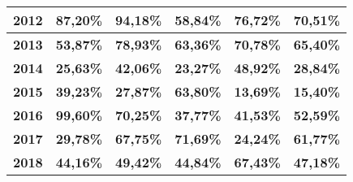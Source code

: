 \documentclass[
	12pt,		%
	a4paper,	%
	english,	%
	brazil,		%
	openright,	%
	oneside		%
	]{abntex2}
\begin{document}
\begin{table}[h]
\begin{tabular}{|c|c|c|c|c|c|}
\rowcolor[HTML]{80C397} 
\textbf{2012}                         & \textbf{87,20\%}                                              & \textbf{94,18\%}                                                & \textbf{58,84\%}                                                  & \textbf{76,72\%}                                                     & \textbf{70,51\%}                                                             \\ \hline
\textbf{2013}                         & \textbf{53,87\%}                                              & \textbf{78,93\%}                                                & \textbf{63,36\%}                                                  & \textbf{70,78\%}                                                     & \textbf{65,40\%}                                                             \\ \hline
\rowcolor[HTML]{80C397} 
\textbf{2014}                         & \textbf{25,63\%}                                              & \textbf{42,06\%}                                                & \textbf{23,27\%}                                                  & \textbf{48,92\%}                                                     & \textbf{28,84\%}                                                             \\ \hline
\cellcolor[HTML]{FFFFFF}\textbf{2015} & \textbf{39,23\%}                                              & \textbf{27,87\%}                                                & \textbf{63,80\%}                                                  & \textbf{13,69\%}                                                     & \textbf{15,40\%}                                                             \\ \hline
\rowcolor[HTML]{80C397} 
\textbf{2016}                         & \textbf{99,60\%}                                              & \textbf{70,25\%}                                                & \textbf{37,77\%}                                                  & \textbf{41,53\%}                                                     & \textbf{52,59\%}                                                             \\ \hline
\textbf{2017}                         & \textbf{29,78\%}                                              & \textbf{67,75\%}                                                & \textbf{71,69\%}                                                  & \textbf{24,24\%}                                                     & \textbf{61,77\%}                                                             \\ \hline
\rowcolor[HTML]{80C397} 
\textbf{2018}                         & \textbf{44,16\%}                                              & \textbf{49,42\%}                                                & \textbf{44,84\%}                                                  & \textbf{67,43\%}                                                     & \textbf{47,18\%}                                                             

\end{tabular}
\label{table:table_ana}
\end{table}
\end{document}
